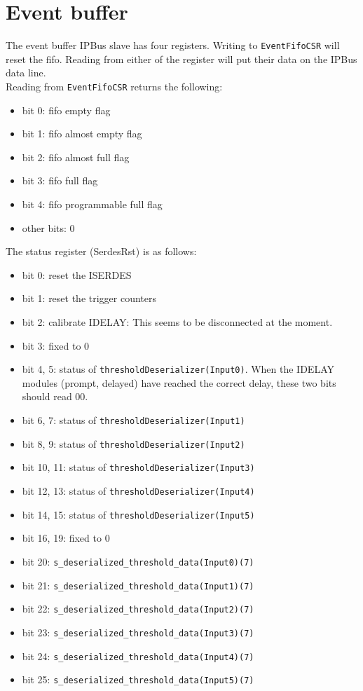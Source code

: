 \section{Event buffer}\label{ch:eventBuffer}
The event buffer IPBus slave has four registers.
Writing to \verb|EventFifoCSR| will reset the \gls{fifo}. Reading from either of the register will put their data on the IPBus data line.\\
Reading from \verb|EventFifoCSR| returns the following:
\begin{itemize}
  \item bit 0: \gls{fifo} empty flag
  \item bit 1: \gls{fifo} almost empty flag
  \item bit 2: \gls{fifo} almost full flag
  \item bit 3: \gls{fifo} full flag
  \item bit 4: \gls{fifo} programmable full flag
  \item other bits: 0
\end{itemize}


The status register (SerdesRst) is as follows:
\begin{itemize}
  \item bit 0: reset the ISERDES
  \item bit 1: reset the trigger counters
  \item bit 2: calibrate IDELAY: This seems to be disconnected at the moment.
  \item bit 3: fixed to 0
  \item bit 4, 5: status of \verb|thresholdDeserializer(Input0)|. When the IDELAY modules (prompt, delayed) have reached the correct delay, these two bits should read 00.
  \item bit 6, 7: status of \verb|thresholdDeserializer(Input1)|
  \item bit 8, 9: status of \verb|thresholdDeserializer(Input2)|
  \item bit 10, 11: status of \verb|thresholdDeserializer(Input3)|
  \item bit 12, 13: status of \verb|thresholdDeserializer(Input4)|
  \item bit 14, 15: status of \verb|thresholdDeserializer(Input5)|
  \item bit 16, 19: fixed to 0
  \item bit 20: \verb|s_deserialized_threshold_data(Input0)(7)|
  \item bit 21: \verb|s_deserialized_threshold_data(Input1)(7)|
  \item bit 22: \verb|s_deserialized_threshold_data(Input2)(7)|
  \item bit 23: \verb|s_deserialized_threshold_data(Input3)(7)|
  \item bit 24: \verb|s_deserialized_threshold_data(Input4)(7)|
  \item bit 25: \verb|s_deserialized_threshold_data(Input5)(7)|
  \end{itemize}

